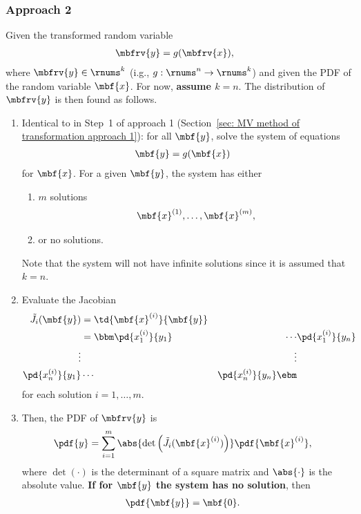 \subsubsection{Approach 2}
\begin{myBlackBox}
    Given the transformed random variable    
    \begin{align}
        \mbfrv{y} &= g(\mbfrv{x}),
    \end{align}
    where $\mbfrv{y}\in\rnums^{k}$ (i.g., $g:\rnums^{n}\to\rnums^{k}$) and given the PDF of the random variable $\mbf{x}$. For now, \textbf{assume $k=n$}. The distribution of $\mbfrv{y}$ is then found as follows.
    \begin{enumerate}
        \item Identical to in Step~1 of approach 1 (Section~\ref{sec: MV method of transformation approach 1}): for all $\mbf{y}$, solve the system of equations
        \begin{align}
            \mbf{y} &= g(\mbf{x})
        \end{align}
        for $\mbf{x}$. For a given $\mbf{y}$, the system has either
        \begin{enumerate}
            \item $m$ solutions
            \begin{align}
                \mbf{x}^{(1)}, \ldots, \mbf{x}^{(m)},
            \end{align}
            \item or no solutions.
        \end{enumerate}
        Note that the system will not have infinite solutions since it is assumed that $k=n$.
        \item Evaluate the Jacobian 
        \begin{align}
            \tilde{J}_{i}(\mbf{y})           
            &= \td{\mbf{x}^{(i)}}{\mbf{y}}\\
            &= \bbm
             \pd{{x}_{1}^{(i)}}{y_{1}} &\cdots &\pd{{x}_{1}^{(i)}}{y_{n}} \\
                \vdots & & \vdots\\
             \pd{{x}_{n}^{(i)}}{y_{1}} &\cdots &\pd{{x}_{n}^{(i)}}{y_{n}}
             \ebm
        \end{align}
        for each solution $i=1,\ldots,m$.
        \item Then, the PDF of $\mbfrv{y}$ is
        \begin{align}
            \pdf{y} &= 
            \sum_{i=1}^{m} {\abs{\operatorname{det}\left(\tilde{J}_{i}(\mbf{x}^{(i)})\right)}}{\pdf{\mbf{x}^{(i)}}},
        \end{align}
        where $\operatorname{det}(\cdot)$ is the determinant of a square matrix and $\abs{\cdot}$ is the absolute value. \textbf{If for $\mbf{y}$ the system has no solution}, then 
        \begin{align}
            \pdf{\mbf{y}} &= \mbf{0}.
        \end{align}
    \end{enumerate}
\end{myBlackBox}
